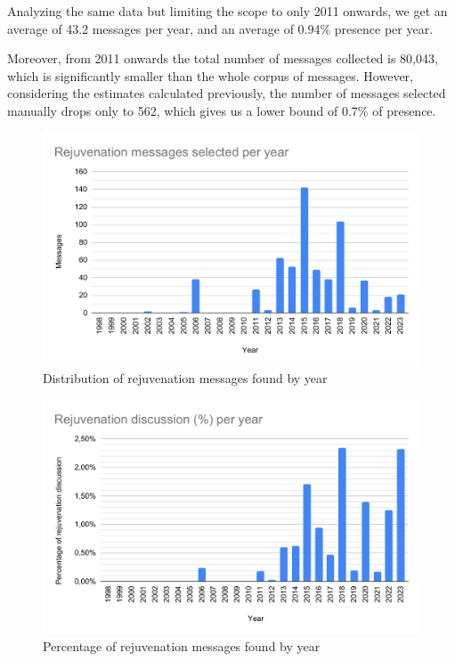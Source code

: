 Analyzing the same data but limiting the scope to only 2011 onwards, we get an average of 43.2 messages per year, and an average of 0.94\% presence per year.

Moreover, from 2011 onwards the total number of messages collected is 80,043, which is significantly smaller than the whole corpus of messages. However, considering the estimates calculated previously, the number of messages selected manually drops only to 562, which gives us a lower bound of 0.7\% of presence.

\begin{figure}[h]
  \centering
  \includegraphics[width=\linewidth]{images/rejuv_msg_per_year.pdf}
  \caption{Distribution of rejuvenation messages found by year}
  \label{fig:msg_year}
\end{figure}

\begin{figure}[h]
  \centering
  \includegraphics[width=\linewidth]{images/rejuv_proportion_per_year.pdf}
  \caption{Percentage of rejuvenation messages found by year}
  \label{fig:prop_year}
\end{figure}

